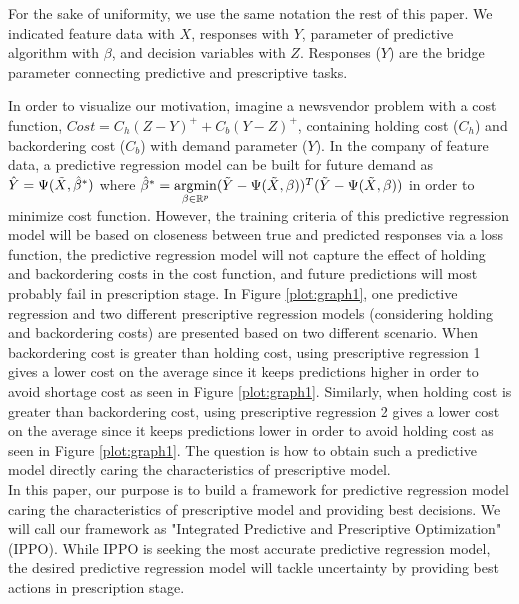 \documentclass[12pt]{article}
\DeclareMathOperator*{\argmin}{argmin}
\begin{document}
For the sake of uniformity, we use the same notation the rest of this paper. We indicated feature data with $X$, responses with $Y$, parameter of predictive algorithm with $\beta$, and decision variables with $Z$. Responses ($Y$) are the bridge parameter connecting predictive and prescriptive tasks.

In order to visualize our motivation, imagine a newsvendor problem with a cost function, $Cost=C_h(Z-Y)^++C_b(Y-Z)^+$, containing holding cost ($C_h$) and backordering cost ($C_b$) with demand parameter ($Y$). In the company of feature data, a predictive regression model can be built for future demand as $\hat{Y}=\Psi(\Tilde{X},\hat{\beta}^*)$ where $\hat{\beta}^*=\argmin\limits_{\beta \in \mathbb{R}^{p}} (\Tilde{Y}-\Psi(\Tilde{X},\beta))^T(\Tilde{Y}-\Psi(\Tilde{X},\beta))$ in order to minimize cost function.
However, the training criteria of this predictive regression model will be based on closeness between true and predicted responses via a loss function, the predictive regression model will not capture the effect of holding and backordering costs in the cost function, and future predictions will most probably fail in prescription stage. In Figure \ref{plot:graph1}, one predictive regression and two different prescriptive regression models (considering holding and backordering costs) are presented based on two different scenario. When backordering cost is greater than holding cost, using prescriptive regression 1 gives a lower cost on the average since it keeps predictions higher in order to avoid shortage cost as seen in Figure \ref{plot:graph1}. Similarly, when holding cost is greater than backordering cost, using prescriptive regression 2 gives a lower cost on the average since it keeps predictions lower in order to avoid holding cost as seen in Figure \ref{plot:graph1}. The question is how to obtain such a predictive model directly caring the characteristics of prescriptive model.\\
In this paper, our purpose is to build a framework for predictive regression model caring the characteristics of prescriptive model and providing best decisions. We will call our framework as "Integrated Predictive and Prescriptive Optimization" (IPPO). While IPPO is seeking the most accurate predictive regression model, the desired predictive regression model will tackle uncertainty by providing best actions in prescription stage.
\end{document}
